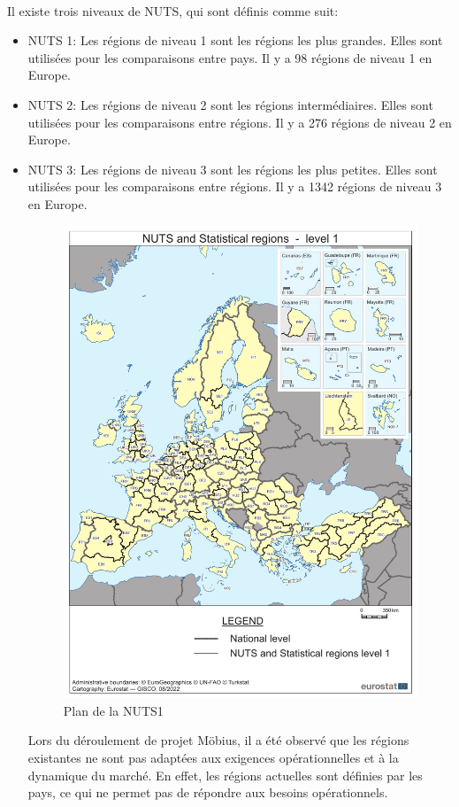 \paragraph{}
\vspace{-2em}
Il existe trois niveaux de NUTS, qui sont définis comme suit:
\begin{itemize}
    \item NUTS 1: Les régions de niveau 1 sont les régions les plus grandes. Elles sont utilisées pour les comparaisons entre pays. Il y a 98 régions de niveau 1 en Europe.
    \item NUTS 2: Les régions de niveau 2 sont les régions intermédiaires. Elles sont utilisées pour les comparaisons entre régions. Il y a 276 régions de niveau 2 en Europe.
    \item NUTS 3: Les régions de niveau 3 sont les régions les plus petites. Elles sont utilisées pour les comparaisons entre régions. Il y a 1342 régions de niveau 3 en Europe.
\begin{figure}[H]
    \centering
    \includegraphics[width=0.45\linewidth]{./Graphismes-UTC/logos/Amazon/NUTS1.pdf}\hfill
    \caption{Plan de la NUTS1}
\end{figure}

Lors du déroulement de projet Möbius, il a été observé que les régions existantes ne sont pas adaptées aux exigences opérationnelles et à la dynamique du marché. En effet, les régions actuelles sont définies par les pays, ce qui ne permet pas de répondre aux besoins opérationnels. 


\end{itemize}

